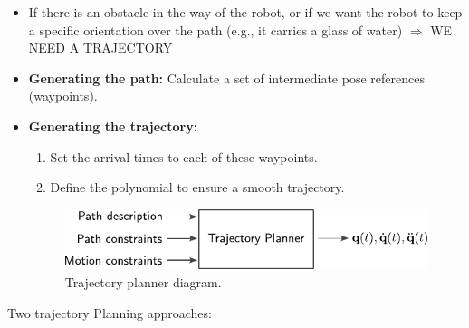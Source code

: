 \documentclass[10pt, aspectratio=169]{beamer}
\theoremstyle{remark}
\theoremstyle{definition}
\begin{document}
\begin{frame}[allowframebreaks]
    \framebreak
    \begin{itemize}
        \item If there is an obstacle in the way of the robot, or if we want the robot to keep a specific orientation over the path (e.g., it carries a glass of water) $\Rightarrow$ \textcolor{uma_pink}{WE NEED A TRAJECTORY}
        \item \textbf{Generating the path:} Calculate a set of intermediate pose references (waypoints).
        \item \textbf{Generating the trajectory:} 
        \begin{enumerate}
            \item Set the arrival times to each of these waypoints.
            \item Define the polynomial to ensure a smooth trajectory.
        \end{enumerate}

        \vspace{0.5cm}
        \begin{figure}
            \centering
            \includegraphics{images/trajectory_planner_schema.pdf}
            \caption{Trajectory planner diagram.}
        \end{figure}
        
    \end{itemize}

    \framebreak
    Two trajectory Planning approaches:
    

\end{frame}
\end{document}
